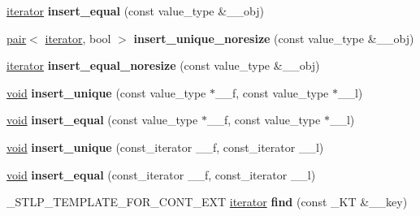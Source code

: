 \begin{DoxyCompactItemize}
\item 
\mbox{\label{classhashtable_a5a694e9d853644b71654e0b0a82a2246}} 
\hyperlink{structiterator}{iterator} {\bfseries insert\+\_\+equal} (const value\+\_\+type \&\+\_\+\+\_\+obj)
\item 
\mbox{\label{classhashtable_aaf417fbfb94c9c9a4ef33a4dc7fc6f80}} 
\hyperlink{structpair}{pair}$<$ \hyperlink{structiterator}{iterator}, bool $>$ {\bfseries insert\+\_\+unique\+\_\+noresize} (const value\+\_\+type \&\+\_\+\+\_\+obj)
\item 
\mbox{\label{classhashtable_af2ae0bd7b170c562c13fc5270ea3317d}} 
\hyperlink{structiterator}{iterator} {\bfseries insert\+\_\+equal\+\_\+noresize} (const value\+\_\+type \&\+\_\+\+\_\+obj)
\item 
\mbox{\label{classhashtable_abc78f4e2494542433a5d48b610012540}} 
\hyperlink{interfacevoid}{void} {\bfseries insert\+\_\+unique} (const value\+\_\+type $\ast$\+\_\+\+\_\+f, const value\+\_\+type $\ast$\+\_\+\+\_\+l)
\item 
\mbox{\label{classhashtable_a906d1973cb8233c69f6bbc6a14447806}} 
\hyperlink{interfacevoid}{void} {\bfseries insert\+\_\+equal} (const value\+\_\+type $\ast$\+\_\+\+\_\+f, const value\+\_\+type $\ast$\+\_\+\+\_\+l)
\item 
\mbox{\label{classhashtable_a7d6ed31a630f60f771aba6e018717604}} 
\hyperlink{interfacevoid}{void} {\bfseries insert\+\_\+unique} (const\+\_\+iterator \+\_\+\+\_\+f, const\+\_\+iterator \+\_\+\+\_\+l)
\item 
\mbox{\label{classhashtable_a36a544f9d96dad053e3aee0dc4d9deda}} 
\hyperlink{interfacevoid}{void} {\bfseries insert\+\_\+equal} (const\+\_\+iterator \+\_\+\+\_\+f, const\+\_\+iterator \+\_\+\+\_\+l)
\item 
\mbox{\label{classhashtable_a9f6c7c05b8895882a3de2764831a0eca}} 
\+\_\+\+S\+T\+L\+P\+\_\+\+T\+E\+M\+P\+L\+A\+T\+E\+\_\+\+F\+O\+R\+\_\+\+C\+O\+N\+T\+\_\+\+E\+XT \hyperlink{structiterator}{iterator} {\bfseries find} (const \+\_\+\+KT \&\+\_\+\+\_\+key)
\item 
\mbox{\label{classhashtable_a0e2a79c8576a96fa82752485844d04e1}} 

\end{DoxyCompactItemize}
